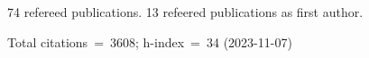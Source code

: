 74 refereed publications. 13 refeered publications as first author.

Total citations~=~3608; h-index~=~34 (2023-11-07)